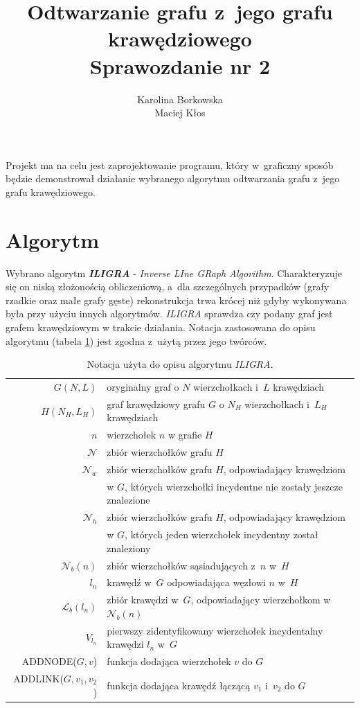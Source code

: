 \documentclass{article}
\date{}
\author{Karolina Borkowska \\ Maciej Kłos}
\title{Odtwarzanie grafu z~jego grafu krawędziowego\\
		{\large Sprawozdanie nr 2}}
\begin{document}
	\maketitle

Projekt ma na celu jest zaprojektowanie programu, który w~graficzny sposób będzie demonstrował
działanie wybranego algorytmu odtwarzania grafu z~jego grafu krawędziowego.

\section{Algorytm}

Wybrano algorytm \textbf{\textit{ILIGRA}}\cite{algo} - \textit{Inverse LIne GRaph Algorithm}. Charakteryzuje się on niską złożonością obliczeniową, a~dla szczególnych przypadków (grafy rzadkie oraz małe grafy gęste) rekonstrukcja trwa krócej niż gdyby wykonywana była przy użyciu innych algorytmów. \textit{ILIGRA} sprawdza czy podany graf jest grafem krawędziowym w trakcie działania. Notacja zastosowana do opisu algorytmu (tabela \ref{notacja}) jest zgodna z~użytą przez jego twórców. 

\begin{table}[H]
	\caption{Notacja użyta do opisu algorytmu \textit{ILIGRA}.}
	\label{notacja}
	\hline
	\hline
	\vspace{2.5mm}
	\begin{tabular}{r l}
		$G(N,L)$&oryginalny graf o $N$ wierzchołkach i~$L$ krawędziach\\
		$H(N_H,L_H)$&graf krawędziowy grafu $G$ o $N_H$ wierzchołkach i~$L_H$ krawędziach\\
		$n$&wierzchołek $n$ w grafie $H$\\
		$\mathcal{N}$&zbiór wierzchołków grafu $H$\\
		$\mathcal{N}_w$&zbiór wierzchołków grafu $H$, odpowiadający krawędziom \\&w $G$, których wierzchołki incydentne nie zostały jeszcze znalezione\\
		$\mathcal{N}_h$&zbiór wierzchołków grafu $H$, odpowiadający krawędziom \\&w $G$, których jeden wierzchołek incydentny został znaleziony\\
		$\mathcal{N}_b(n)$&zbiór wierzchołków sąsiadujących z~$n$ w~$H$\\
		$l_n$&krawędź w~$G$ odpowiadająca węzłowi $n$ w~$H$\\
		$\mathcal{L}_b(l_n)$&zbiór krawędzi w~$G$, odpowiadający wierzchołkom w~$\mathcal{N}_b(n)$\\
		$V_{l_n}$&pierwszy zidentyfikowany wierzchołek incydentalny krawędzi $l_n$ w~$G$\\
		ADDNODE($G,v$)& funkcja dodająca wierzchołek $v$ do $G$\\
		ADDLINK($G,v_1,v_2$)&funkcja dodająca krawędź łączącą $v_1$ i~$v_2$ do $G$\\
	\end{tabular} 
 	\hline
\end{table}
\end{document}
